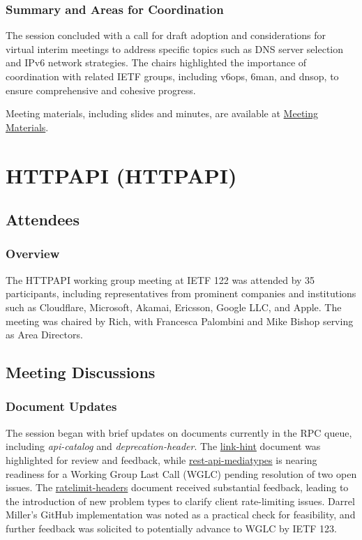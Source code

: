 \documentclass{article}
\begin{document}
\subsubsection{Summary and Areas for Coordination}
The session concluded with a call for draft adoption and considerations for virtual interim meetings to address specific topics such as DNS server selection and IPv6 network strategies. The chairs highlighted the importance of coordination with related IETF groups, including v6ops, 6man, and dnsop, to ensure comprehensive and cohesive progress.

Meeting materials, including slides and minutes, are available at \href{https://datatracker.ietf.org/meeting/122/materials/slides-122-happy}{Meeting Materials}.



\newpage

\section{HTTPAPI (HTTPAPI)}

\subsection{Attendees}
\subsubsection{Overview}
The HTTPAPI working group meeting at IETF 122 was attended by 35 participants, including representatives from prominent companies and institutions such as Cloudflare, Microsoft, Akamai, Ericsson, Google LLC, and Apple. The meeting was chaired by Rich, with Francesca Palombini and Mike Bishop serving as Area Directors.

\subsection{Meeting Discussions}

\subsubsection{Document Updates}
The session began with brief updates on documents currently in the RPC queue, including \textit{api-catalog} and \textit{deprecation-header}. The \href{https://datatracker.ietf.org/doc/html/draft-ietf-httpapi-link-hint}{link-hint} document was highlighted for review and feedback, while \href{https://datatracker.ietf.org/doc/html/draft-ietf-httpapi-rest-api-mediatypes}{rest-api-mediatypes} is nearing readiness for a Working Group Last Call (WGLC) pending resolution of two open issues. The \href{https://datatracker.ietf.org/doc/html/draft-ietf-httpapi-ratelimit-headers}{ratelimit-headers} document received substantial feedback, leading to the introduction of new problem types to clarify client rate-limiting issues. Darrel Miller's GitHub implementation was noted as a practical check for feasibility, and further feedback was solicited to potentially advance to WGLC by IETF 123.
\end{document}

